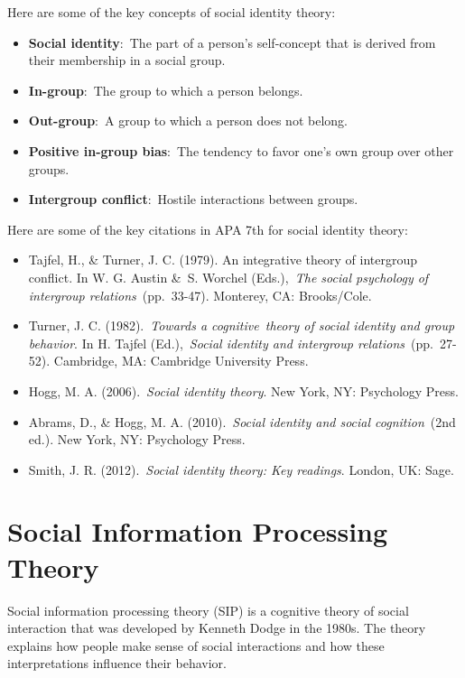 \documentclass[
  b5paper]{book}
\begin{document}
Here are some of the key concepts of social identity theory:

\begin{itemize}
\item
  \textbf{Social identity}:~The part of a person's self-concept that is derived from their membership in a social group.
\item
  \textbf{In-group}:~The group to which a person belongs.
\item
  \textbf{Out-group}:~A group to which a person does not belong.
\item
  \textbf{Positive in-group bias}:~The tendency to favor one's own group over other groups.
\item
  \textbf{Intergroup conflict}:~Hostile interactions between groups.
\end{itemize}

Here are some of the key citations in APA 7th for social identity theory:

\begin{itemize}
\item
  Tajfel, H., \& Turner, J. C. (1979). An integrative theory of intergroup conflict. In W. G. Austin \&~S. Worchel (Eds.),~\emph{The social psychology of intergroup relations}~(pp.~33-47). Monterey, CA: Brooks/Cole.
\item
  Turner, J. C. (1982).~\emph{Towards a cognitive~theory of social identity and group behavior}. In H. Tajfel (Ed.),~\emph{Social identity and intergroup relations}~(pp.~27-52). Cambridge, MA: Cambridge University Press.
\item
  Hogg, M. A. (2006).~\emph{Social identity theory}. New York, NY: Psychology Press.
\item
  Abrams, D., \& Hogg, M. A. (2010).~\emph{Social identity and social cognition}~(2nd ed.). New York, NY: Psychology Press.
\item
  Smith, J. R. (2012).~\emph{Social identity theory: Key readings}. London, UK: Sage.
\end{itemize}

\hypertarget{social-information-processing-theory}{%
\section{Social Information Processing Theory}\label{social-information-processing-theory}}

Social information processing theory (SIP) is a cognitive theory of social interaction that was developed by Kenneth Dodge in the 1980s. The theory explains how people make sense of social interactions and how these interpretations influence their behavior.
\end{document}
